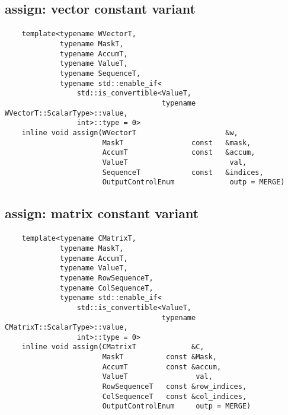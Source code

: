 \subsection{{\sf assign}: vector constant variant}

\paragraph{\syntax}

\begin{verbatim}
    template<typename WVectorT,
             typename MaskT,
             typename AccumT,
             typename ValueT,
             typename SequenceT,
             typename std::enable_if<
                 std::is_convertible<ValueT,
                                     typename WVectorT::ScalarType>::value,
                 int>::type = 0>
    inline void assign(WVectorT                     &w,
                       MaskT                const   &mask,
                       AccumT               const   &accum,
                       ValueT                        val,
                       SequenceT            const   &indices,
                       OutputControlEnum             outp = MERGE)
\end{verbatim}


\subsection{{\sf assign}: matrix constant variant}

\paragraph{\syntax}

\begin{verbatim}
    template<typename CMatrixT,
             typename MaskT,
             typename AccumT,
             typename ValueT,
             typename RowSequenceT,
             typename ColSequenceT,
             typename std::enable_if<
                 std::is_convertible<ValueT,
                                     typename CMatrixT::ScalarType>::value,
                 int>::type = 0>
    inline void assign(CMatrixT             &C,
                       MaskT          const &Mask,
                       AccumT         const &accum,
                       ValueT                val,
                       RowSequenceT   const &row_indices,
                       ColSequenceT   const &col_indices,
                       OutputControlEnum     outp = MERGE)
\end{verbatim}



